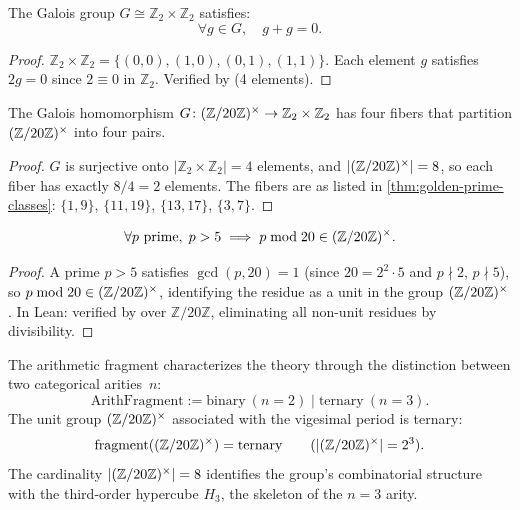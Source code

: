 \begin{proposition}\label{prop:exponent-two}
The Galois group $G\cong\mathbb{Z}_2\times\mathbb{Z}_2$ satisfies:
\begin{equation}\label{eq:exponent-two}
  \forall g\in G,\quad g + g = 0.
\end{equation}
\end{proposition}

\begin{proof}
$\mathbb{Z}_2\times\mathbb{Z}_2 = \{(0,0),(1,0),(0,1),(1,1)\}$.
Each element $g$ satisfies $2g = 0$ since $2\equiv 0$ in $\mathbb{Z}_2$.
Verified by  (4 elements).
\end{proof}

\begin{proposition}\label{prop:fiber-partition}
The Galois homomorphism $G\colon(\mathbb{Z}/20\mathbb{Z})^\times\to\mathbb{Z}_2\times\mathbb{Z}_2$
has four fibers that partition $(\mathbb{Z}/20\mathbb{Z})^\times$ into four pairs.
\end{proposition}

\begin{proof}
$G$ is surjective onto $|\mathbb{Z}_2\times\mathbb{Z}_2|=4$ elements,
and $|(\mathbb{Z}/20\mathbb{Z})^\times|=8$, so each fiber has exactly $8/4=2$ elements.  The
fibers are as listed in \cref{thm:golden-prime-classes}:
$\{1,9\}$, $\{11,19\}$, $\{13,17\}$, $\{3,7\}$.
\end{proof}

\begin{theorem}\label{thm:zeta-forced}
\begin{equation}\label{eq:primes-in-ZtwentyStar}
  \forall p\text{ prime},\; p > 5 \implies
    p\bmod 20 \in (\mathbb{Z}/20\mathbb{Z})^\times.
\end{equation}
\end{theorem}

\begin{proof}
A prime $p>5$ satisfies $\gcd(p,20)=1$ (since $20=2^2\cdot 5$ and
$p\nmid 2$, $p\nmid 5$), so $p\bmod 20\in(\mathbb{Z}/20\mathbb{Z})^\times$, identifying the residue as a
unit in the group $(\mathbb{Z}/20\mathbb{Z})^\times$.  In Lean: verified by  over
$\mathbb{Z}/20\mathbb{Z}$, eliminating all non-unit residues by
divisibility.
\end{proof}

\begin{definition}\label{def:arith-fragment}
The arithmetic fragment characterizes the theory through the distinction 
between two categorical arities~$n$:
\begin{equation}\label{eq:arith-fragment}
  \mathrm{ArithFragment} :=
    \mathrm{binary}~(n{=}2) \mid \mathrm{ternary}~(n{=}3).
\end{equation}
The unit group $(\mathbb{Z}/20\mathbb{Z})^\times$ associated with the vigesimal period is ternary:
\begin{equation}\label{eq:ZtwentyStar-fragment}
  \mathrm{fragment}((\mathbb{Z}/20\mathbb{Z})^\times) = \mathrm{ternary}
  \qquad (|(\mathbb{Z}/20\mathbb{Z})^\times| = 2^3).
\end{equation}
The cardinality $|(\mathbb{Z}/20\mathbb{Z})^\times|=8$ identifies the group's combinatorial structure with the third-order hypercube $H_3$, the skeleton of the $n=3$ arity.
\end{definition}

